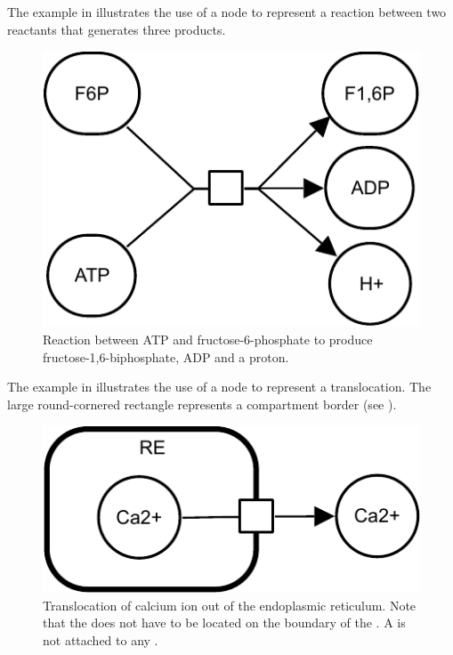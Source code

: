 The example in  illustrates the use of a  node to represent a reaction between two reactants that generates three products.

\begin{figure}[htb]
  \centering
  \includegraphics[scale = 0.3]{examples/process-reaction}
  \caption{Reaction between ATP and fructose-6-phosphate to produce fructose-1,6-biphosphate, ADP and a proton.}
  \label{fig:techref:trans-react}
\end{figure}

The example in  illustrates the use of a  node to represent a translocation. The large round-cornered rectangle represents a compartment border (see ).

\begin{figure}[htb]
  \centering
  \includegraphics[scale = 0.3]{examples/process-translocation}
  \caption{Translocation of calcium ion out of the endoplasmic reticulum. Note that the  does not have to be located on the boundary of the . A  is not attached to any .}
  \label{fig:techref:trans-trans}
\end{figure}

